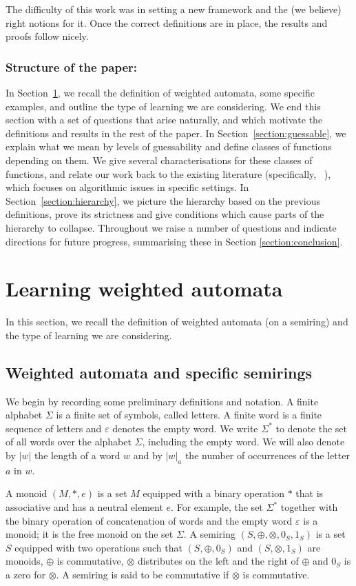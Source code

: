 \documentclass[10pt,a4paper]{amsart}
\theoremstyle{definition}
\numberwithin{equation}{section}
\numberwithin{theorem}{section}
\begin{document}
The difficulty of this work was in setting a new framework and the (we believe) right notions for it. Once the correct definitions are in place, the results and proofs follow nicely. 

\subsubsection*{\textbf{Structure of the paper:}} In Section~\ref{section:prelim}, we recall the definition of weighted automata, some specific examples, and outline the type of learning we are considering. We end this section with a set of questions that arise naturally, and which motivate the definitions and results in the rest of the paper. In Section~\ref{section:guessable}, we explain what we mean by levels of guessability and define classes of functions depending on them. We give several characterisations for these classes of functions, and relate our work back to the existing literature (specifically, ~\cite{HKRS20}), which focuses on algorithmic issues in specific settings. In Section~\ref{section:hierarchy}, we picture the hierarchy based on the previous definitions, prove its strictness and give conditions which cause parts of the hierarchy to collapse. Throughout we raise a number of questions and indicate directions for future progress, summarising these in Section \ref{section:conclusion}.

\section{Learning weighted automata}
\label{section:prelim}

In this section, we recall the definition of weighted automata (on a semiring) and the type of learning we are considering.

\subsection{Weighted automata and specific semirings}
We begin by recording some preliminary definitions and notation. A finite alphabet $\Sigma$ is a finite set of symbols, called letters.  A finite word is a finite sequence of letters and $\varepsilon$ denotes the empty word. We write $\Sigma^*$ to denote the set of all words over the alphabet $\Sigma$, including the empty word. We will also denote by $|w|$ the length of a word $w$ and by $|w|_a$ the number of occurrences of the letter $a$ in $w$.

A monoid $(M,\ast,e)$ is a set $M$ equipped with a binary operation $\ast$ that is associative and has a neutral element $e$. For example, the set $\Sigma^*$ together with the binary operation of concatenation of words and the empty word $\varepsilon$ is a monoid; it is the free monoid on the set $\Sigma$. A semiring $(S,\oplus,\otimes,0_S,1_S)$ is a set $S$ equipped with two operations such that $(S,\oplus,0_S)$ and $(S,\otimes,1_S)$ are monoids, $\oplus$ is commutative, $\otimes$ distributes on the left and the right of $\oplus$ and $0_S$ is a zero for $\otimes$.  A semiring is said to be commutative if $\otimes$ is commutative.
\end{document}
